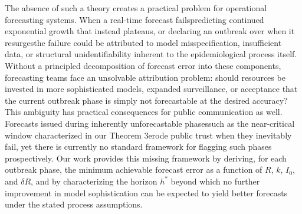 \documentclass[review]{elsarticle}
\theoremstyle{plain}
\theoremstyle{definition}
\begin{document}
The absence of such a theory creates a practical problem for operational forecasting systems. When a real-time forecast fails\textemdash predicting continued exponential growth that instead plateaus, or declaring an outbreak over when it resurges\textemdash the failure could be attributed to model misspecification, insufficient data, or structural unidentifiability inherent to the epidemiological process itself. Without a principled decomposition of forecast error into these components, forecasting teams face an unsolvable attribution problem: should resources be invested in more sophisticated models, expanded surveillance, or acceptance that the current outbreak phase is simply not forecastable at the desired accuracy? This ambiguity has practical consequences for public communication as well. Forecasts issued during inherently unforecastable phases\textemdash such as the near-critical window characterized in our Theorem 3\textemdash erode public trust when they inevitably fail, yet there is currently no standard framework for flagging such phases prospectively. Our work provides this missing framework by deriving, for each outbreak phase, the minimum achievable forecast error as a function of $R$, $k$, $I_0$, and $\delta R$, and by characterizing the horizon $h^*$ beyond which no further improvement in model sophistication can be expected to yield better forecasts under the stated process assumptions.
\end{document}
